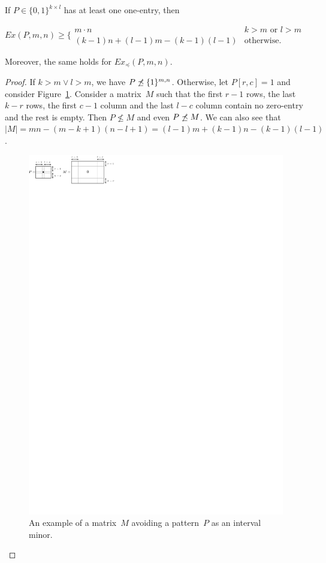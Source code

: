 \begin{lemma}
If $P\in\{0,1\}^{k\times l}$ has at least one one-entry, then

$Ex(P,m,n)\geq\Big\{\begin{array}{ll}
m\cdot n & k>m\text{ or } l>m \\
(k-1)n+(l-1)m-(k-1)(l-1) & \text{otherwise.}
\end{array}$

Moreover, the same holds for $Ex_{\preceq}(P,m,n).$
\end{lemma}
\begin{proof}
If $k>m\vee l>m$, we have $P\not\preceq\{1\}^{m,n}$. Otherwise, let $P[r,c]=1$ and consider Figure~\ref{fig:minimalist}. Consider a matrix~$M$ such that the first $r-1$ rows, the last $k-r$ rows, the first $c-1$ column and the last $l-c$ column contain no zero-entry and the rest is empty. Then $P\not\leq M$ and even $P\not\preceq M$. We can also see that $|M|=mn-(m-k+1)(n-l+1)=(l-1)m+(k-1)n-(k-1)(l-1)$.

\begin{figure}[!ht]
\centering
\includegraphics[width=120mm]{img/minimalist.pdf}
\caption{An example of a matrix~$M$ avoiding a pattern~$P$ as an interval minor.}
\label{fig:minimalist}
\end{figure}
\end{proof}

